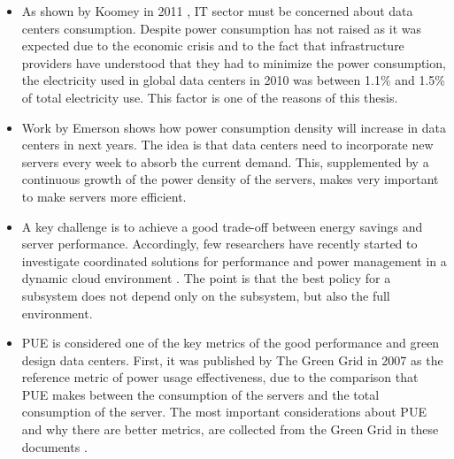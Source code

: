\begin{itemize}
    \item As shown by Koomey in 2011 \cite{koomey2011growth}, IT sector must be concerned about data centers consumption. Despite power consumption has not raised as it was expected due to the economic crisis and to the fact that infrastructure providers have understood that they had to minimize the power consumption, the electricity used in global data centers in 2010 was between 1.1\% and 1.5\% of total electricity use. This factor is one of the reasons of this thesis.
    
\item Work by Emerson \cite{emersonDC} shows how power consumption density will increase in data centers in next years. The idea is that data centers need to incorporate new servers every week to absorb the current demand. This, supplemented by a continuous growth of the power density of the servers, makes very important to make servers more efficient.

    \item A key challenge is to achieve a good trade-off between energy savings and server performance. Accordingly, few researchers have recently started to investigate coordinated solutions for performance and power management in a dynamic cloud environment \cite{Kumar:2009:VLC:1555228.1555262}. The point is that the best policy for a subsystem does not depend only on the subsystem, but also the full environment. 

    \item PUE is considered one of the key metrics of the good performance and green design data centers. First, it was published by The Green Grid in 2007 as the reference metric of power usage effectiveness, due to the comparison that PUE makes between the consumption of the servers and the total consumption of the server. The most important considerations about PUE and why there are better metrics, are collected from the Green Grid in these documents \cite{amer2013pue} \cite{GreenGrid2010Eff}.
    
\end{itemize}


